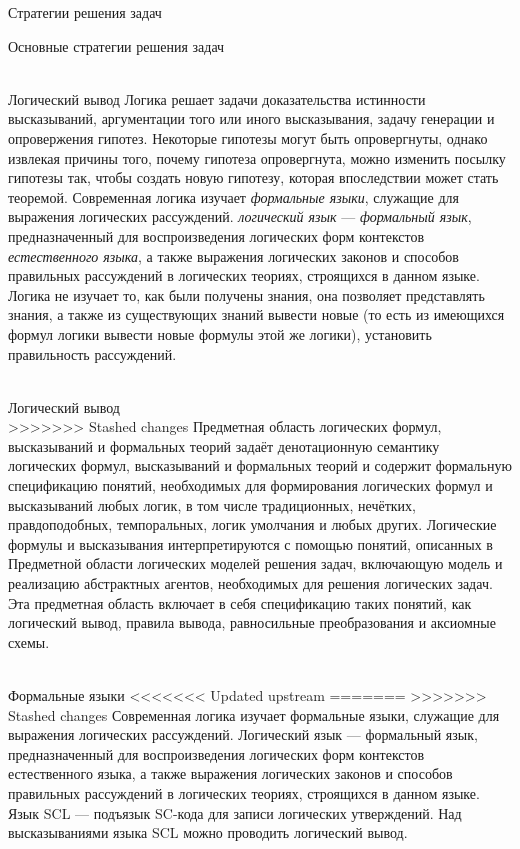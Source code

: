 \begin{frame}{Стратегии решения задач}
\begin{frame}{\large Основные стратегии решения задач}
\begin{textitemize}
\begin{frame}{\\Логический вывод}
        Логика решает задачи доказательства истинности высказываний, аргументации того или иного высказывания, задачу генерации и опровержения гипотез. Некоторые гипотезы могут быть опровергнуты, однако извлекая причины того, почему гипотеза опровергнута, можно изменить посылку гипотезы так, чтобы создать новую гипотезу, которая впоследствии может стать теоремой.
        Современная логика изучает \textit{формальные языки}, служащие для выражения логических рассуждений. \textit{логический язык} — \textit{формальный язык}, предназначенный для воспроизведения логических форм контекстов \textit{естественного языка}, а также выражения логических законов и способов правильных рассуждений в логических теориях, строящихся в данном языке. Логика не изучает то, как были получены знания, она позволяет представлять знания, а также из существующих знаний вывести новые (то есть из имеющихся формул логики вывести новые формулы этой же логики), установить правильность рассуждений.
\end{frame}

\begin{frame}{\\Логический вывод}
\topline
\vspace{40}
 \\
 
>>>>>>> Stashed changes
        Предметная область логических формул, высказываний и формальных теорий задаёт денотационную семантику логических формул, высказываний и формальных теорий и содержит формальную спецификацию понятий, необходимых для формирования логических формул и высказываний любых логик, в том числе традиционных, нечётких, правдоподобных, темпоральных, логик умолчания и любых других. Логические формулы и высказывания интерпретируются с помощью понятий, описанных в Предметной области логических моделей решения задач, включающую модель и реализацию абстрактных агентов, необходимых для решения логических задач. Эта предметная область включает в себя спецификацию таких понятий, как логический вывод, правила вывода, равносильные преобразования и аксиомные схемы.
\end{frame}

\begin{frame}{\\Формальные языки}
<<<<<<< Updated upstream
=======
\topline
>>>>>>> Stashed changes
        Современная логика изучает формальные языки, служащие для выражения логических рассуждений. Логический язык — формальный язык, предназначенный для воспроизведения логических форм контекстов естественного языка, а также выражения логических законов и способов правильных рассуждений в логических теориях, строящихся в данном языке.
        \\Язык SCL — подъязык SC-кода для записи логических утверждений. Над высказываниями языка SCL можно проводить логический вывод.
\end{frame}


\end{textitemize}
\end{frame}
\end{frame}
